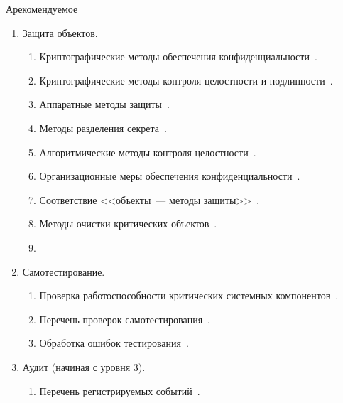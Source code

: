 \begin{appendix}{А}{рекомендуемое}
\begin{enumerate}
\begin{enumerate}
\item
Состояния СКЗИ и правила перехода между состояниями~.
\end{enumerate}

\item
{Защита объектов.}

\begin{enumerate}
\item
Криптографические методы обеспечения конфиденциальности~.

\item
Криптографические методы контроля целостности и 
подлинности~. 

\item
Аппаратные методы защиты~.

\item
Методы разделения секрета~.

\item
Алгоритмические методы контроля целостности~.

\item
Организационные меры обеспечения конфиденциальности~.

\item
Соответствие <<объекты~--- методы защиты>>~.

\item
Методы очистки критических объектов~.

\item
{}
\end{enumerate}

\item
{Самотестирование.}

\begin{enumerate}
\item
Проверка работоспособности критических системных компонентов~.

\item
Перечень проверок самотестирования~.

\item
Обработка ошибок тестирования~.
\end{enumerate}

\item
Аудит (начиная с уровня 3).

\begin{enumerate}
\item
Перечень регистрируемых событий~.


\end{enumerate}
\end{enumerate}
\end{appendix}
